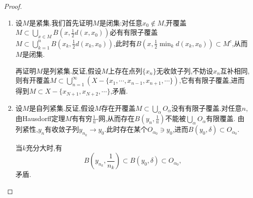 \documentclass{ctexart}
\theoremstyle{definition}
\theoremstyle{remark}
\begin{document}
	\begin{proof}
		\begin{enumerate}
			\item 设$M$是紧集.我们首先证明$M$是闭集:对任意$x_0\notin M$,开覆盖$M\subset\bigcup_{x\in M}{B(x,\frac{1}{2}d(x,x_0))}$必有有限子覆盖$M\subset \bigcup_{k=1}^n{B(x_k,\frac{1}{2}d(x_k,x_0))}$,此时有$B(x,\frac{1}{2}\min_k{d(x_k,x_0)})\subset M^c$,从而$M$是闭集.
			
			再证明$M$是列紧集.反证,假设$M$上存在点列$\{x_n\}$无收敛子列,不妨设$x_n$互补相同,则有开覆盖$M\subset\bigcup_{n=1}^\infty{(X-\{x_1,\cdots,x_{n-1},x_{n+1},\cdots\})}$,它有有限子覆盖,进而得到$M\subset X-\{x_{N+1},x_{N+2},\cdots\}$,矛盾.
			
			\item 设$M$是自列紧集.反证,假设$M$存在开覆盖$M\subset\bigcup_{\alpha}{O_\alpha}$没有有限子覆盖.对任意$n$,由Hausdorff定理$M$有有穷$\frac{1	}{n}$-网,从而存在$B(y_n,\frac{1}{n})$不能被$\bigcup_\alpha{O_\alpha}$有限覆盖.
			由列紧性,$y_n$有收敛子列$y_{n_k}\to y_0$.此时存在某个$O_{\alpha_0}\ni y_0$,进而$B(y_0,\delta)\subset O_{\alpha_0}$.
			
			当$k$充分大时,有
			$$B(y_{n_k},\frac{1}{n_k})\subset B(y_0,\delta)\subset O_{\alpha_0},$$
			矛盾.
		\end{enumerate}
	\end{proof}
	
\end{document}
